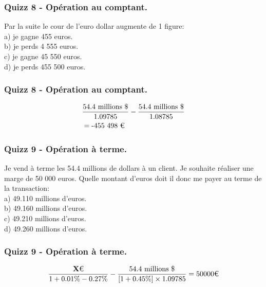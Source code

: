 \documentclass{beamer}
\begin{document}
\begin{frame}
\frametitle{Quizz 8 - Opération au comptant.}
Par la suite le cour de l'euro dollar augmente de 1 figure: \\
\vspace{0.5cm}
a) je gagne 455 euros. \\
b) je perds 4 555 euros.  \\
c) je gagne 45 550 euros. \\
d) je perds 455 500 euros.  \\
\vspace{0.5cm}
\end{frame}


\begin{frame}
\frametitle{Quizz 8 - Opération au comptant.}
\huge
\[
\begin{split}
&\frac{\text{54.4 millions \$}}{1.09785}-\frac{\text{54.4 millions \$}}{1.08785}\\
&=\text{-455 498 \texteuro}\\
\end{split}
\]
\end{frame}


\begin{frame}
\frametitle{Quizz 9 - Opération à terme.}
Je vend à terme les 54.4 millions de dollars à un client. Je souhaite réaliser une marge de 50 000 euros. Quelle montant d'euros doit il donc me payer au terme de la transaction:\\
\vspace{0.5cm}
a) 49.110 millions d'euros. \\
b) 49.160 millions d'euros. \\
c) 49.210 millions d'euros. \\
d) 49.260 millions d'euros.\\
\vspace{0.5cm}
\end{frame}


\begin{frame}
\frametitle{Quizz 9 - Opération à terme.}
\Large
\[
\frac{\textbf{X} \text{\texteuro}}{1+0.01\%-0.27\%}-\frac{54.4 \text{ millions } \$}{[1+0.45\%] \times 1.09785}=50 000 \text{\texteuro}
\]
\end{frame}
\end{document}
